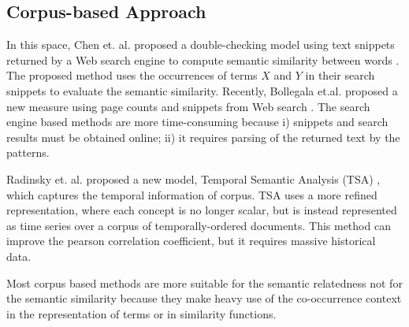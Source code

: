 \subsection{Corpus-based Approach}

In this space, Chen et. al. proposed a double-checking model
using text snippets returned by a Web search engine
to compute semantic similarity between words \cite{Chen:2006}.
The proposed method uses the occurrences of terms $X$ and $Y$
in their search snippets to evaluate the semantic similarity.
Recently, Bollegala et.al. proposed a new measure using
page counts and snippets from Web search \cite{Bollegala:2011}.
The search engine based methods are more time-consuming because
i) snippets and search results must be obtained online;
ii) it requires parsing of the returned text by the patterns.

Radinsky et. al. proposed
a new model, Temporal Semantic Analysis (TSA)
\cite{Kira:2011}, which captures the temporal information of corpus.
TSA uses a more refined representation, where each concept is no
longer scalar, but is instead represented as time series over a
corpus of temporally-ordered documents. This method can improve the
pearson correlation coefficient, but it requires massive historical data.

Most corpus based methods are more suitable for the semantic
relatedness not for the semantic similarity because they
make heavy use of the co-occurrence context in the representation
of terms or in similarity functions.
